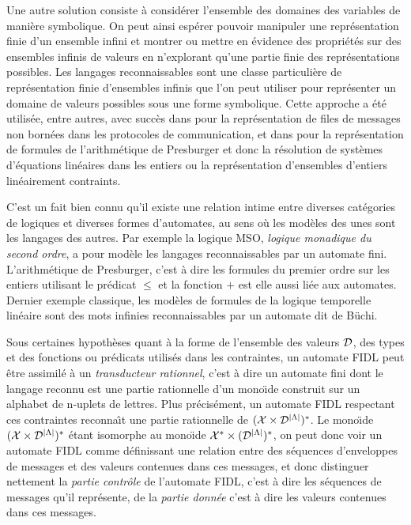 Une autre solution consiste \`a consid\'erer l'ensemble des domaines
des variables de mani\`ere symbolique. On peut ainsi esp\'erer
pouvoir manipuler une repr\'esentation finie d'un ensemble infini et
montrer ou mettre en \'evidence des propri\'et\'es sur des
ensembles infinis de valeurs en n'explorant qu'une partie finie des
repr\'esentations possibles. Les langages reconnaissables sont une
classe particuli\`ere de repr\'esentation finie d'ensembles infinis
que l'on peut utiliser pour repr\'esenter un domaine de valeurs
possibles sous une forme symbolique. 
Cette approche a \'et\'e utilis\'ee, entre autres, avec succ\`es dans \cite{boigelot-verif-proto} pour la
repr\'esentation de files de messages non born\'ees dans les
protocoles de communication, et dans \cite{wolper-auto-constraint} pour
la repr\'esentation de formules de l'arithm\'etique de Presburger et
donc la r\'esolution de syst\`emes d'\'equations lin\'eaires dans
les entiers ou la repr\'esentation d'ensembles d'entiers
lin\'eairement contraints. 

C'est un fait bien connu qu'il existe une relation intime entre
diverses cat\'egories de logiques et diverses formes d'automates, au
sens o\`u les mod\`eles des unes sont les langages des autres. Par
exemple la logique \textsf{MSO}, \emph{logique monadique du second
  ordre}, a pour mod\`ele les langages reconnaissables par un
automate fini. L'arithm\'etique
de Presburger, c'est \`a dire les formules du premier ordre sur les
entiers utilisant le pr\'edicat $\leq$ et la fonction $+$ est elle
aussi li\'ee aux automates. Dernier exemple classique, les mod\`eles
de formules de la logique temporelle lin\'eaire sont des mots
infinies reconnaissables par un automate dit de B\"uchi. 

Sous certaines hypoth\`eses quant \`a la forme de l'ensemble des valeurs $\cal D$, des types et
des fonctions ou pr\'edicats utilis\'es dans les contraintes, un
automate \textsf{FIDL} peut \^etre assimil\'e \`a un
\emph{transducteur rationnel}, c'est \`a dire un automate fini dont
le langage reconnu est une partie rationnelle d'un mono\"{\i}de 
construit sur un alphabet de n-uplets de lettres. Plus
pr\'ecis\'ement, un automate \textsf{FIDL} respectant ces
contraintes reconna\^{\i}t une partie rationnelle de $({\cal X}\times{}{\cal
  D}^{\vert \Lambda \vert})^*$. Le mono\"{\i}de $({\cal X}\times{}{\cal
  D}^{\vert \Lambda \vert})^*$ \'etant isomorphe au mono\"{\i}de ${\cal
  X}^*\times{}({\cal D}^{\vert \Lambda \vert})^*$, on peut donc voir un
automate \textsf{FIDL} comme d\'efinissant une relation entre des
s\'equences d'enveloppes de messages et des valeurs contenues dans
ces messages, et donc distinguer nettement la \emph{partie
  contr\^ole} de l'automate FIDL, c'est \`a dire les s\'equences de
messages qu'il repr\'esente, de la \emph{partie donn\'ee} c'est \`a
dire les valeurs contenues dans ces messages.

